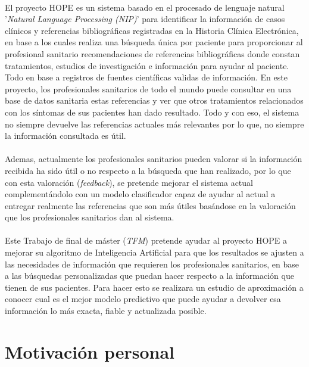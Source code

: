 \paragraph{}
El proyecto HOPE es un sistema basado en el procesado de lenguaje natural '\textit{Natural Language Processing (NIP)}' para identificar la información de casos clínicos y referencias bibliográficas registradas en la Historia Clínica Electrónica, en base a los cuales realiza una búsqueda única por paciente para proporcionar al profesional sanitario recomendaciones de referencias bibliográficas donde constan tratamientos, estudios de investigación e información para ayudar al paciente. Todo en base a registros de fuentes científicas validas de información. En este proyecto, los profesionales sanitarios de todo el mundo puede consultar en una base de datos sanitaria estas referencias y ver que otros tratamientos relacionados con los síntomas de sus pacientes han dado resultado. Todo y con eso, el sistema no siempre devuelve las referencias actuales más relevantes por lo que, no siempre la información consultada es útil\cite{ref:pfm_karla}.

\paragraph{}
Ademas, actualmente los profesionales sanitarios pueden valorar si la información recibida ha sido útil o no respecto a la búsqueda que han realizado, por lo que con esta valoración (\textit{feedback}), se pretende mejorar el sistema actual complementándolo con un modelo clasificador capaz de ayudar al actual a entregar realmente las referencias que son más útiles basándose en la valoración que los profesionales sanitarios dan al sistema.

\paragraph{}
Este Trabajo de final de máster (\textit{TFM}) pretende ayudar al proyecto HOPE a mejorar su algoritmo de Inteligencia Artificial para que los resultados se ajusten a las necesidades de información que requieren los profesionales sanitarios, en base a las búsquedas personalizadas que puedan hacer respecto a la información que tienen de sus pacientes. Para hacer esto se realizara un estudio de aproximación a conocer cual es el mejor modelo predictivo que puede ayudar a devolver esa información lo más exacta, fiable y actualizada posible.

\section{Motivación personal}


